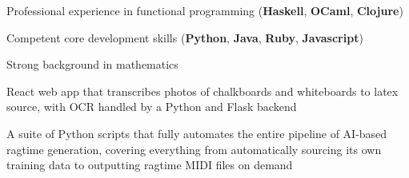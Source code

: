 
\vspace{\topsep}
\begin{tightitemize}
    \item Professional experience in functional programming (\textbf{Haskell}, 
        \textbf{OCaml},
        \textbf{Clojure})
    \item Competent core development skills (\textbf{Python}, \textbf{Java}, 
    \textbf{Ruby}, \textbf{Javascript})
    \item Strong background in mathematics
\end{tightitemize}

\smallskip
{}

React web app that transcribes photos of chalkboards and whiteboards to latex 
source, with OCR handled by a Python and Flask backend

\divider

A suite of Python scripts that fully automates the entire pipeline of
AI-based ragtime generation, covering everything from automatically sourcing 
its own training data to outputting ragtime MIDI files on demand

\smallskip
{}

\smallskip
{}

\divider


\divider






